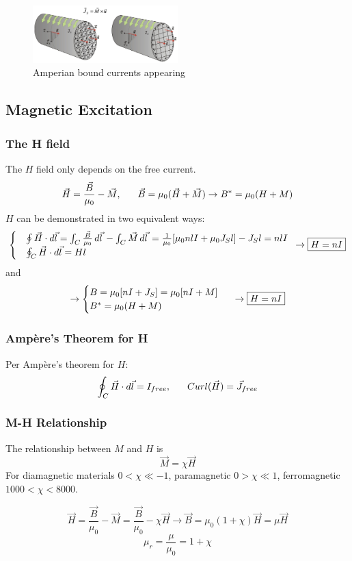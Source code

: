 \documentclass[a4paper]{article}
\begin{document}
\begin{figure}[h]
    \centering
    \includegraphics[width=0.5\textwidth]{IMG/js.png}
    \caption{Amperian bound currents appearing}
    \label{fig:js}
\end{figure}

\subsection{Magnetic Excitation}
\subsubsection{The H field}
The $H$ field only depends on the free current.
$$
\vec{H}=\frac{\vec{B}}{\mu_{0}}-\vec{M}, \hspace{4ex}\vec{B}=\mu_{0}(\vec{H}+\vec{M})\to B^*=\mu_{0} (H+M)
$$
$H$ can be demonstrated in two equivalent ways:
$$
\begin{cases}
&\oint \vec{H}\cdot d\vec{l}=\int_{C} \frac{\vec{B}}{\mu_{0}} \, d\vec{l}\,-\int_{C}^{} \vec{M} \, d\vec{l}\, = \frac{1}{\mu_{0}}[\mu_{0}nlI+\mu_{0}J_{S}l]-J_{S}l=nlI \\
&\oint_{C} \vec{H}\cdot d\vec{l}=Hl
\end{cases} \hspace{1ex}\to \boxed{H=nI}
$$
and
$$
\to\begin{cases}
B=\mu_{0}[nI+J_{S}]=\mu_{0}[nI+M] \\
B^*=\mu_{0}(H+M)
\end{cases}\hspace{1ex}\to \boxed{H=nI}
$$

\subsubsection{Ampère's Theorem for H}
Per Ampère's theorem for $H$:
$$
\oint_{C}\vec{H}\cdot d\vec{l}=I_{f r e e}, \hspace{4ex}Curl(\vec{H})=\vec{J}_{f r e e}
$$

\subsubsection{M-H Relationship}
The relationship between $M$ and $H$ is
$$
\vec{M}=\chi \vec{H}
$$
For diamagnetic materials $0<\chi\ll-1$, paramagnetic $0>\chi\ll 1$, ferromagnetic $1000<\chi<8000$.

$$
\vec{H}=\frac{\vec{B}}{\mu_{0}}-\vec{M}=\frac{\vec{B}}{\mu_{0}}-\chi \vec{H} \to \vec{B}=\mu_{0}(1+\chi)\vec{H}=\mu \vec{H}
$$
$$
\mu_{r}=\frac{\mu}{\mu_{0}}=1+\chi
$$
\end{document}
